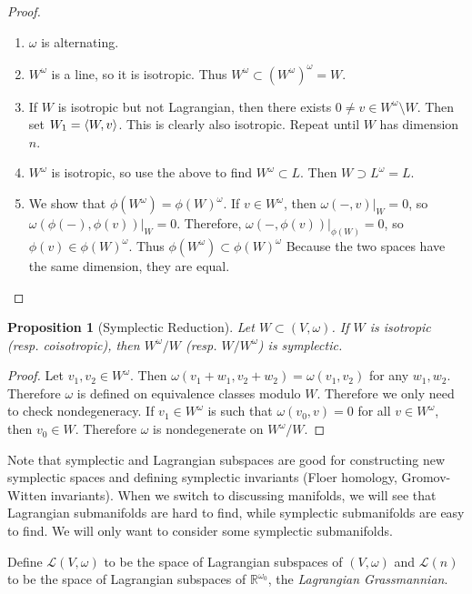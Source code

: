 \documentclass[leqno, openany]{memoir}
\DeclarePairedDelimiter{\gen}{\langle}{\rangle}
\newtheorem{prop}[thm]{Proposition}
\theoremstyle{definition}
\theoremstyle{remark}
\theoremstyle{plain}
\theoremstyle{definition}
\theoremstyle{remark}
\newcommand{\R}{\mathbb{R}}
\newcommand{\mc}[1]{\mathcal{#1}}
\begin{document}
\begin{proof} \begin{enumerate} \item $\omega$ is alternating.  \item
    $W^{\omega}$ is a line, so it is isotropic. Thus $W^{\omega} \subset (
    W^{\omega} )^{\omega} = W$.  \item If $W$ is isotropic but not Lagrangian,
    then there exists $0 \neq v \in W^{\omega} \setminus W$. Then set $W_1 =
    \gen{W, v}$. This is clearly also isotropic. Repeat until $W$ has dimension
    $n$.  \item $W^{\omega}$ is isotropic, so use the above to find $W^{\omega}
    \subset L$. Then $W \supset L^{\omega} = L$.  \item We show that
    $\phi(W^{\omega}) = \phi(W)^{\omega}$. If $v \in W^{\omega}$, then
    $\omega(-, v)|_{W} = 0$, so $\omega(\phi(-), \phi(v))|_W = 0$. Therefore,
    $\omega(-, \phi(v))|_{\phi(W)} = 0$, so $\phi(v) \in \phi(W)^{\omega}$.
    Thus $\phi(W^{\omega}) \subset \phi(W)^{\omega}$ Because the two spaces
    have the same dimension, they are equal. \qedhere \end{enumerate}
\end{proof}

\begin{prop}[Symplectic Reduction] Let $W \subset (V, \omega)$. If $W$ is
isotropic (resp. coisotropic), then $W^{\omega}/W$ (resp. $W/W^{\omega}$) is
symplectic.  \end{prop}

\begin{proof} Let $v_1, v_2 \in W^{\omega}$. Then $\omega(v_1 + w_1, v_2 + w_2)
    = \omega(v_1, v_2)$ for any $w_1, w_2$. Therefore $\omega$ is defined on
    equivalence classes modulo $W$. Therefore we only need to check
    nondegeneracy. If $v_1 \in W^{\omega}$ is such that $\omega(v_0, v) = 0$
    for all $v \in W^{\omega}$, then $v_0 \in W$. Therefore $\omega$ is
    nondegenerate on $W^{\omega}/W$.  \end{proof}

Note that symplectic and Lagrangian subspaces are good for constructing new
symplectic spaces and defining symplectic invariants (Floer homology,
Gromov-Witten invariants). When we switch to discussing manifolds, we will see
that Lagrangian submanifolds are hard to find, while symplectic submanifolds
are easy to find. We will only want to consider some symplectic submanifolds.

Define $\mc{L}(V, \omega)$ to be the space of Lagrangian subspaces of $(V,
\omega)$ and $\mc{L}(n)$ to be the space of Lagrangian subspaces of
$\R^{\omega_0}$, the \textit{Lagrangian Grassmannian}. 
\end{document}

